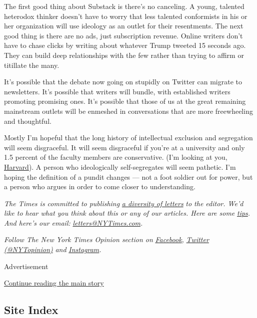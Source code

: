 The first good thing about Substack is there's no canceling. A young,
talented heterodox thinker doesn't have to worry that less talented
conformists in his or her organization will use ideology as an outlet
for their resentments. The next good thing is there are no ads, just
subscription revenue. Online writers don't have to chase clicks by
writing about whatever Trump tweeted 15 seconds ago. They can build deep
relationships with the few rather than trying to affirm or titillate the
many.

It's possible that the debate now going on stupidly on Twitter can
migrate to newsletters. It's possible that writers will bundle, with
established writers promoting promising ones. It's possible that those
of us at the great remaining mainstream outlets will be enmeshed in
conversations that are more freewheeling and thoughtful.

Mostly I'm hopeful that the long history of intellectual exclusion and
segregation will seem disgraceful. It will seem disgraceful if you're at
a university and only 1.5 percent of the faculty members are
conservative. (I'm looking at you,
\href{https://www.thecrimson.com/article/2020/3/3/faculty-support-warren-president/}{Harvard}).
A person who ideologically self-segregates will seem pathetic. I'm
hoping the definition of a pundit changes --- not a foot soldier out for
power, but a person who argues in order to come closer to understanding.

\emph{The Times is committed to publishing}
\href{https://www.nytimes3xbfgragh.onion/2019/01/31/opinion/letters/letters-to-editor-new-york-times-women.html}{\emph{a
diversity of letters}} \emph{to the editor. We'd like to hear what you
think about this or any of our articles. Here are some}
\href{https://help.nytimes3xbfgragh.onion/hc/en-us/articles/115014925288-How-to-submit-a-letter-to-the-editor}{\emph{tips}}\emph{.
And here's our email:}
\href{mailto:letters@NYTimes.com}{\emph{letters@NYTimes.com}}\emph{.}

\emph{Follow The New York Times Opinion section on}
\href{https://www.facebookcorewwwi.onion/nytopinion}{\emph{Facebook}}\emph{,}
\href{http://twitter.com/NYTOpinion}{\emph{Twitter (@NYTopinion)}}
\emph{and}
\href{https://www.instagram.com/nytopinion/}{\emph{Instagram}}\emph{.}

Advertisement

\protect\hyperlink{after-bottom}{Continue reading the main story}

\hypertarget{site-index}{%
\subsection{Site Index}\label{site-index}}

